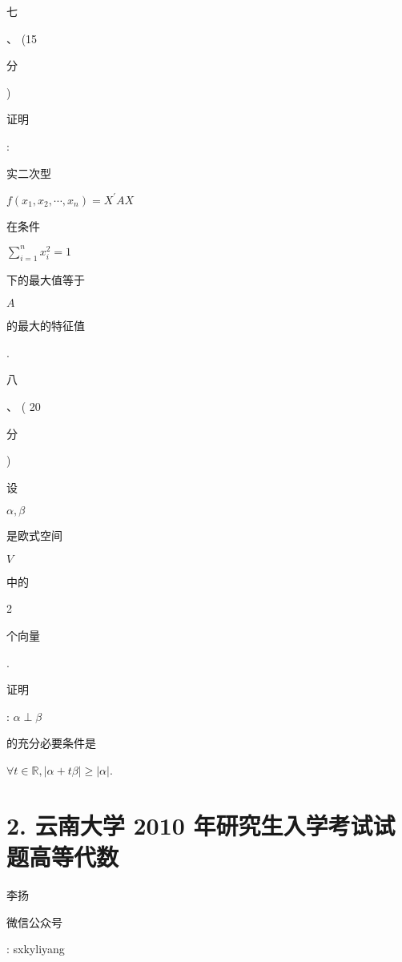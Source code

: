 \documentclass[10pt]{article}
\begin{document}
\begin{CJK}{UTF8}{mj}七\end{CJK}、 (15 \begin{CJK}{UTF8}{mj}分\end{CJK}) \begin{CJK}{UTF8}{mj}证明\end{CJK}: \begin{CJK}{UTF8}{mj}实二次型\end{CJK} $f\left(x_{1}, x_{2}, \cdots, x_{n}\right)=X^{\prime} A X$ \begin{CJK}{UTF8}{mj}在条件\end{CJK} $\sum_{i=1}^{n} x_{i}^{2}=1$ \begin{CJK}{UTF8}{mj}下的最大值等于\end{CJK} $A$ \begin{CJK}{UTF8}{mj}的最大的特征值\end{CJK}.

\begin{CJK}{UTF8}{mj}八\end{CJK}、 ( 20 \begin{CJK}{UTF8}{mj}分\end{CJK}) \begin{CJK}{UTF8}{mj}设\end{CJK} $\alpha, \beta$ \begin{CJK}{UTF8}{mj}是欧式空间\end{CJK} $V$ \begin{CJK}{UTF8}{mj}中的\end{CJK} 2 \begin{CJK}{UTF8}{mj}个向量\end{CJK}. \begin{CJK}{UTF8}{mj}证明\end{CJK}: $\alpha \perp \beta$ \begin{CJK}{UTF8}{mj}的充分必要条件是\end{CJK} $\forall t \in \mathbb{R},|\alpha+t \beta| \geqslant|\alpha|$.

\section{2. 云南大学 2010 年研究生入学考试试题高等代数}
\begin{CJK}{UTF8}{mj}李扬\end{CJK}

\begin{CJK}{UTF8}{mj}微信公众号\end{CJK}: sxkyliyang
\end{document}
